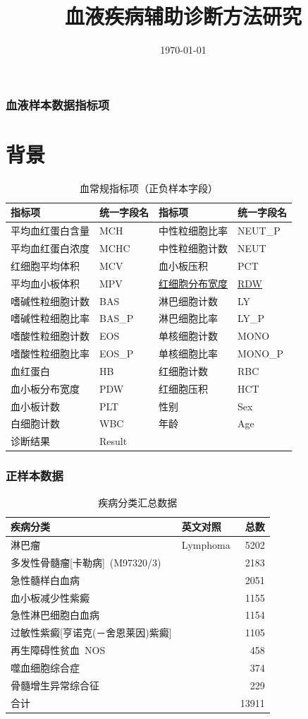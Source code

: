 \documentclass[UTF8,aspectratio=1610,10pt]{ctexbeamer}
\begin{document}
\title[Blood Diseases Diagnosis]{血液疾病辅助诊断方法研究}
\author[ ]{ }
\institute[math]{}
\date[ ]{\today}
\frame{\titlepage}

\begin{frame}
\frametitle{血液样本数据指标项}

\section{背景}

\begin{table}
\centering
\caption{血常规指标项（正负样本字段）}
\begin{tabular}{|l|l||l|l|}
\toprule
指标项	&	统一字段名 & 指标项	&	统一字段名 \\
\midrule
平均血红蛋白含量	&	MCH	&	中性粒细胞比率	&	NEUT\_P	\\
平均血红蛋白浓度	&	MCHC	&	中性粒细胞计数	&	NEUT	\\
红细胞平均体积	&	MCV	&	血小板压积	&	PCT	\\
平均血小板体积	&	MPV	&	\underline{红细胞分布宽度}	&	\underline{RDW}	\\
嗜碱性粒细胞计数	&	BAS	&	淋巴细胞计数	&	LY	\\
嗜碱性粒细胞比率	&	BAS\_P	&	淋巴细胞比率	&	LY\_P	\\
嗜酸性粒细胞计数	&	EOS	&	单核细胞计数	&	MONO	\\
嗜酸性粒细胞比率	&	EOS\_P	&	单核细胞比率	&	MONO\_P	\\
血红蛋白	&	HB	&	红细胞计数	&	RBC	\\
血小板分布宽度	&	PDW	&	红细胞压积	&	HCT	\\
血小板计数	&	PLT	&	性别	&	Sex	\\
白细胞计数	&	WBC	&	年龄	&	Age	\\
诊断结果	&	Result	&		&	\\
\bottomrule
\end{tabular}
\end{table}

\end{frame}

\begin{frame}
\frametitle{正样本数据}
\begin{table}
\caption{疾病分类汇总数据}
\centering
\begin{tabular}{|l|l|r|}
\toprule
疾病分类	& 英文对照	&总数	\\
\midrule
淋巴瘤	& Lymphoma &	5202	\\
多发性骨髓瘤[卡勒病] (M97320/3)	&	&2183	\\
急性髓样白血病	&	&2051	\\
血小板减少性紫癜	&	&1155	\\
急性淋巴细胞白血病	&	&1154	\\
过敏性紫癜[亨诺克(－舍恩莱因)紫癜]	&	&1105	\\
再生障碍性贫血 NOS	&	&458	\\
噬血细胞综合症	&	&374	\\
骨髓增生异常综合征	&	&229	\\
\bottomrule
合计	&	&13911	\\
\bottomrule
\end{tabular}
\end{table}
\end{frame}
\end{document}
